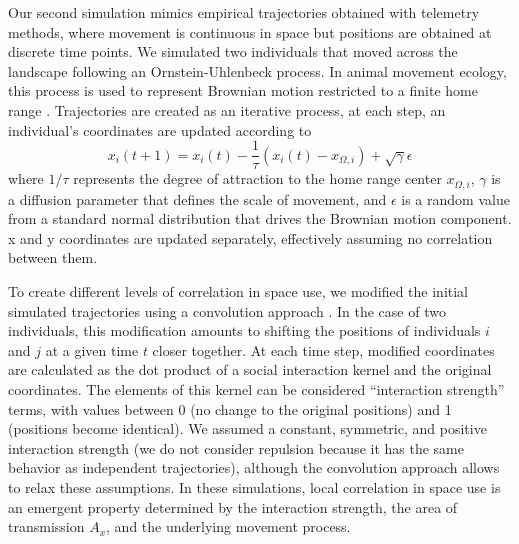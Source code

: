 \documentclass[letterpaper]{article}
\begin{document}
Our second simulation mimics empirical trajectories obtained with telemetry methods, where movement is continuous in space but positions are obtained at discrete time points. We simulated two individuals that moved across the landscape following an Ornstein-Uhlenbeck process. In animal movement ecology, this process is used to represent Brownian motion restricted to a finite home range \citep{Hooten2017a, Blackwell1997}. Trajectories are created as an iterative process, at each step, an individual's coordinates are updated according to %
\begin{equation}
	x_i(t+1)=x_i(t)-\frac{1}{\tau}(x_i(t)-x_{\Omega,i})+\sqrt{\gamma}\epsilon
\end{equation}
where $1/\tau$ represents the degree of attraction to the home range center $x_{\Omega,i}$, $\gamma$ is a diffusion parameter that defines the scale of movement, and $\epsilon$ is a random value from a standard normal distribution that drives the Brownian motion component. x and y coordinates are updated separately, effectively assuming no correlation between them. 

To create different levels of correlation in space use, we modified the initial simulated trajectories using a convolution approach \citep[][, Appendix XX]{Scharf2018}. In the case of two individuals, this modification amounts to shifting the positions of individuals $i$ and $j$ at a given time $t$ closer together. At each time step, modified coordinates are calculated as the dot product of a social interaction kernel and the original coordinates. The elements of this kernel can be considered ``interaction strength'' terms, with values between 0 (no change to the original positions) and 1 (positions become identical). We assumed a constant, symmetric, and positive interaction strength (we do not consider repulsion because it has the same behavior as independent trajectories), although the convolution approach allows to relax these assumptions. In these simulations, local correlation in space use is an emergent property determined by the interaction strength, the area of transmission $A_x$, and the underlying movement process. 
\end{document}
